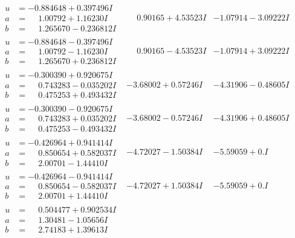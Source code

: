 \documentclass[1p]{elsarticle_modified}
\theoremstyle{definition}
\begin{document}
$$\begin{array}{c|c|c}
\begin{aligned}
u &= -0.884648 + 0.397496 I \\
a &= \phantom{-}1.00792 + 1.16230 I \\
b &= \phantom{-}1.265670 - 0.236812 I\end{aligned}
 & \phantom{-}0.90165 + 4.53523 I & -1.07914 - 3.09222 I \\ \hline\begin{aligned}
u &= -0.884648 - 0.397496 I \\
a &= \phantom{-}1.00792 - 1.16230 I \\
b &= \phantom{-}1.265670 + 0.236812 I\end{aligned}
 & \phantom{-}0.90165 - 4.53523 I & -1.07914 + 3.09222 I \\ \hline\begin{aligned}
u &= -0.300390 + 0.920675 I \\
a &= \phantom{-}0.743283 - 0.035202 I \\
b &= \phantom{-}0.475253 + 0.493432 I\end{aligned}
 & -3.68002 + 0.57246 I & -4.31906 - 0.48605 I \\ \hline\begin{aligned}
u &= -0.300390 - 0.920675 I \\
a &= \phantom{-}0.743283 + 0.035202 I \\
b &= \phantom{-}0.475253 - 0.493432 I\end{aligned}
 & -3.68002 - 0.57246 I & -4.31906 + 0.48605 I \\ \hline\begin{aligned}
u &= -0.426964 + 0.941414 I \\
a &= \phantom{-}0.850654 + 0.582037 I \\
b &= \phantom{-}2.00701 - 1.44410 I\end{aligned}
 & -4.72027 - 1.50384 I & -5.59059 + 0. I\phantom{ +0.000000I} \\ \hline\begin{aligned}
u &= -0.426964 - 0.941414 I \\
a &= \phantom{-}0.850654 - 0.582037 I \\
b &= \phantom{-}2.00701 + 1.44410 I\end{aligned}
 & -4.72027 + 1.50384 I & -5.59059 + 0. I\phantom{ +0.000000I} \\ \hline\begin{aligned}
u &= \phantom{-}0.504477 + 0.902534 I \\
a &= \phantom{-}1.30481 - 1.05656 I \\
b &= \phantom{-}2.74183 + 1.39613 I\end{aligned}

\end{array}$$
\end{document}
